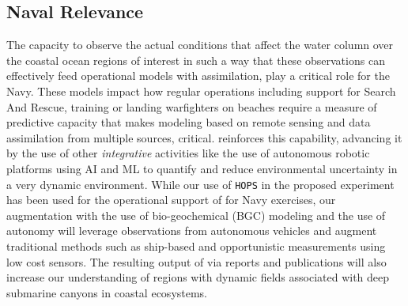 \subsection{Naval Relevance}
\label{sec:naval}

The capacity to observe the actual conditions that affect the water
column over the coastal ocean regions of interest in such a way that
these observations can effectively feed operational models with
assimilation, play a critical role for the Navy. These models impact
how regular operations including support for Search And Rescue,
training or landing warfighters on beaches require a measure of
predictive capacity that makes modeling based on remote sensing and
data assimilation from multiple sources, critical. \proj reinforces
this capability, advancing it by the use of other \emph{integrative}
activities like the use of autonomous robotic platforms using AI and
ML to quantify and reduce environmental uncertainty in a very dynamic
environment. While our use of \texttt{HOPS} in the proposed experiment
has been used for the operational support of for Navy exercises, our
augmentation with the use of bio-geochemical (BGC) modeling and the
use of autonomy will leverage observations from autonomous vehicles
and augment traditional methods such as ship-based and opportunistic
measurements using low cost sensors. The resulting output of \proj via
reports and publications will also increase our understanding of
regions with dynamic fields associated with deep submarine canyons in
coastal ecosystems.


